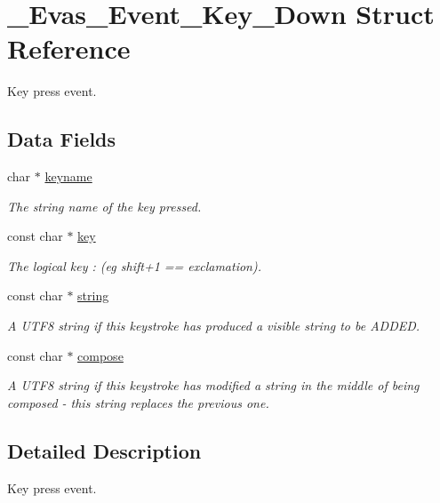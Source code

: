 \section{\_\-Evas\_\-Event\_\-Key\_\-Down Struct Reference}
\label{struct__Evas__Event__Key__Down}


Key press event.  


\subsection*{Data Fields}
\begin{DoxyCompactItemize}
\item 
char $\ast$ \hyperlink{struct__Evas__Event__Key__Down_a01909378c9e67734aa0e6ce2b603ad2c}{keyname}\label{struct__Evas__Event__Key__Down_a01909378c9e67734aa0e6ce2b603ad2c}

\begin{DoxyCompactList}\small\item\em The string name of the key pressed. \item\end{DoxyCompactList}\item 
const char $\ast$ \hyperlink{struct__Evas__Event__Key__Down_a70473bba88a1afaee180a54150513824}{key}\label{struct__Evas__Event__Key__Down_a70473bba88a1afaee180a54150513824}

\begin{DoxyCompactList}\small\item\em The logical key : (eg shift+1 == exclamation). \item\end{DoxyCompactList}\item 
const char $\ast$ \hyperlink{struct__Evas__Event__Key__Down_a1b64741ca0b90a5119463f320ebeea00}{string}\label{struct__Evas__Event__Key__Down_a1b64741ca0b90a5119463f320ebeea00}

\begin{DoxyCompactList}\small\item\em A UTF8 string if this keystroke has produced a visible string to be ADDED. \item\end{DoxyCompactList}\item 
const char $\ast$ \hyperlink{struct__Evas__Event__Key__Down_a5ea3ff931ae945c486abd2388c6d653a}{compose}\label{struct__Evas__Event__Key__Down_a5ea3ff931ae945c486abd2388c6d653a}

\begin{DoxyCompactList}\small\item\em A UTF8 string if this keystroke has modified a string in the middle of being composed -\/ this string replaces the previous one. \item\end{DoxyCompactList}\end{DoxyCompactItemize}


\subsection{Detailed Description}
Key press event. 
